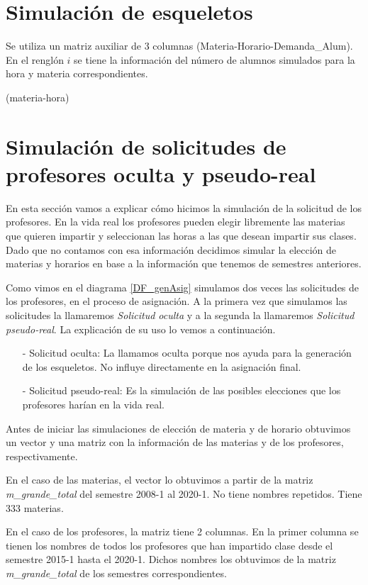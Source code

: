 \section{Simulación de esqueletos}

Se utiliza un matriz auxiliar de 3 columnas (Materia-Horario-Demanda\_Alum). En el renglón $i$ se tiene la información del número de alumnos simulados para la hora y materia correspondientes.

(materia-hora)

\section{Simulación de solicitudes de profesores oculta y pseudo-real}

En esta sección vamos a explicar cómo hicimos la simulación de la solicitud de los profesores. En la vida real los profesores pueden elegir libremente las materias que quieren impartir y seleccionan las horas a las que desean impartir sus clases. Dado que no contamos con esa información decidimos simular la elección de materias y horarios en base a la información que tenemos de semestres anteriores.

Como vimos en el diagrama \ref{DF_genAsig} simulamos dos veces las solicitudes de los profesores, en el proceso de asignación. A la primera vez que simulamos las solicitudes la llamaremos \textit{Solicitud oculta} y a la segunda la llamaremos \textit{Solicitud pseudo-real}. La explicación de su uso lo vemos a continuación.

\begin{itemize}
\item[-] Solicitud oculta: La llamamos oculta porque nos ayuda para la generación de los esqueletos. No influye directamente en la asignación final.

\item[-] Solicitud pseudo-real: Es la simulación de las posibles elecciones que los profesores harían en la vida real.
\end{itemize}

Antes de iniciar las simulaciones de elección de materia y de horario obtuvimos un vector y una matriz con la información de las materias y de los profesores, respectivamente.

En el caso de las materias, el vector lo obtuvimos a partir de la matriz \textit{m\_grande\_total} del semestre 2008-1 al 2020-1. No tiene nombres repetidos. Tiene 333 materias.

En el caso de los profesores, la matriz tiene 2 columnas. En la primer columna se tienen los nombres de todos los profesores que han impartido clase desde el semestre 2015-1 hasta el 2020-1. Dichos nombres los obtuvimos de la matriz \textit{m\_grande\_total} de los semestres correspondientes.

